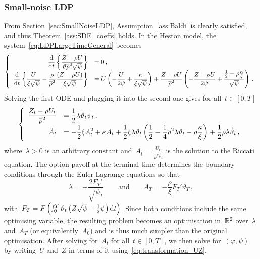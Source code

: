 \subsubsection{Small-noise LDP}
From Section~\ref{sec:SmallNoiseLDP},
Assumption~\ref{ass:Baldi} is clearly satisfied, 
and thus Theorem~\ref{ass:SDE_coeffs} holds.
In the Heston model, the system~\eqref{eq:LDPLargeTimeGeneral} becomes
\begin{equation*}
\left\{
\begin{array}{rl}
\displaystyle \frac{\mathrm{d}}{\mathrm{d} t}\left\{\frac{Z - \rho U}{\vartheta\overline{\rho}^2\sqrt{\psi}}\right\} &= 0\,,\\
\displaystyle \frac{\mathrm{d}}{\mathrm{d} t}\left\{
\frac{U}{\xi \sqrt{\psi}} - \frac{\rho}{\overline{\rho}^2}\frac{(Z - \rho U)}{\xi\sqrt{\psi}} \right\}
&= \displaystyle U\left(-\frac{U}{2\psi} + \frac{\kappa}{\xi \sqrt{\psi}}\right)
+ \frac{Z - \rho U}{\overline{\rho}^2}\left(-\frac{Z-\rho U}{2\psi} + \frac{\frac{1}{2} - \rho \frac{\kappa}{\xi}}{\sqrt{\psi}}\right)\,.
\end{array}
\right.
\end{equation*}
Solving the first ODE and plugging it into the second one gives for all~$t\in[0, T]$
\begin{equation}\label{eq:RiccatiA}
\left\{
\begin{array}{rl}
\displaystyle \frac{Z_t - \rho U_t}{\overline{\rho}^2}
&= \displaystyle \frac{1}{2} \lambda \vartheta_t \psi_t\,,\\
\displaystyle \dot{A}_t &= 
\displaystyle -\frac{1}{2}\xi A_t^2 + \kappa A_t + \frac{1}{2}\xi \lambda \vartheta_t \left(\frac{1}{2} - \frac{1}{4}\overline{\rho}^2\lambda\vartheta_t - \rho\frac{\kappa}{\xi} \right) + \frac{1}{2}\rho\lambda\dot{\vartheta}_t\,,
\end{array}
\right.
\end{equation}
where~$\lambda>0$ is an arbitrary constant and~$A_t = \frac{U_t}{\sqrt{\psi_t}}$ is the solution to the Riccati equation. The option payoff at the terminal time determines the boundary conditions through the Euler-Lagrange equations so that
\[
\lambda = - \frac{2F_T'}{\sqrt{\psi_T}} 
\qquad \text{and} \qquad 
A_T = -\frac{\rho}{\xi}F_T'\vartheta_T\,,
\]
with~$F_T=F\left(\smallint_0^T\vartheta_t\left(Z\sqrt\psi-\frac12\psi\right) \mathrm{d} t\right)$. 
Since both conditions include the same optimising variable, 
the resulting problem becomes an optimisation in~$\mathbb{R}^2$ over~$\lambda$ and~$A_T$ (or equivalently~$A_0$) and is thus much simpler than the original optimisation. 
After solving for~$A_t$ for all~$t\in[0, T]$, we then solve for~$(\varphi,\psi)$ by writing~$U$ and~$Z$ in terms of it using~\eqref{eq:transformation_UZ}. 

